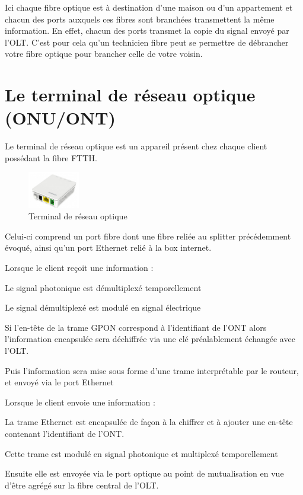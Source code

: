 \documentclass[oneside]{book}
\begin{document}
			
		Ici chaque fibre optique est à destination d’une maison ou d’un appartement et chacun des ports auxquels ces fibres sont branchées transmettent la même information. En effet, chacun des ports transmet la copie du signal envoyé par l’OLT. C’est pour cela qu’un technicien fibre peut se permettre de débrancher votre fibre optique pour brancher celle de votre voisin.



		\section{Le terminal de réseau optique (ONU/ONT)}

		Le terminal de réseau optique est un appareil présent chez chaque client possédant la fibre FTTH.

		\begin{figure}[ht!]
			\centering
			\includegraphics[width=0.2\textwidth]{./object/cables.png}
			\caption{Terminal de réseau optique}
		\end{figure}
		
		\vspace{3cm}

		Celui-ci comprend un port fibre dont une fibre reliée au splitter précédemment évoqué, ainsi qu’un port Ethernet relié à la box internet.

		Lorsque le client reçoit une information :
		\begin{items}{-15pt}{-15pt}
			\item Le signal photonique est démultiplexé temporellement
			\item Le signal démultiplexé est modulé en signal électrique
			\item Si l’en-tête de la trame GPON correspond à l’identifiant de l’ONT alors l’information encapsulée sera déchiffrée via une clé préalablement échangée avec l’OLT.
			\item  Puis l’information sera mise sous forme d’une trame interprétable par le routeur, et envoyé via le port Ethernet
		\end{items}
		
		Lorsque le client envoie une information :
		\begin{items}{-15pt}{-15pt}
		\item La trame Ethernet est encapsulée de façon à la chiffrer et à ajouter une en-tête contenant l’identifiant de l’ONT.
		\item Cette trame est modulé en signal photonique et multiplexé temporellement
		\item  Ensuite elle est envoyée via le port optique au point de mutualisation en vue d'être agrégé sur la fibre central de l’OLT.
			
		\end{items}
\end{document}
